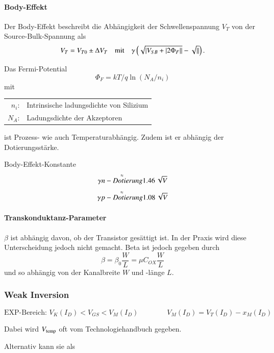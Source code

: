 \paragraph{Body-Effekt}
Der Body-Effekt beschreibt die Abhängigkeit der Schwellenspannung $V_T$ von der Source-Bulk-Spannung als
\[
    V_T = V_{T0} \pm \Delta V_T \quad \text{mit} \quad \gamma\left(\sqrt{\left|V_{SB}+\left|2\Phi_F\right|\right|}-\sqrt{\left|\right|}\right).
\]

Das Fermi-Potential
\[
    \Phi_F = kT/q \ln(N_A/n_i)
\]
mit 
\begin{tabular}{rl}
    $n_i$:& Intrinsische ladungsdichte von Silizium\\
    $N_A$:& Ladungsdichte der Akzeptoren
\end{tabular}
ist Prozess- wie auch Temperaturabhängig.
Zudem ist er abhängig der Dotierungsstärke.



Body-Effekt-Konstante
\[
    \gamma \overset{\approx}{n-Dotierung} \qty{1.46}{\sqrt{\volt}}
\]
\[
    \gamma \overset{\approx}{p-Dotierung} \qty{1.08}{\sqrt{\volt}}
\]
\paragraph{Transkonduktanz-Parameter}
$\beta$ ist abhängig davon, ob der Transistor gesättigt ist. 
In der Praxis wird diese Unterscheidung jedoch nicht gemacht. 
Beta ist jedoch gegeben durch 
\[
    \beta = \beta_0 \frac{W}{L} = \mu C_{OX} \frac{W}{L}
\]
und so abhängig von der Kanalbreite $W$ und -länge $L$.



\subsubsection{Weak Inversion}

\vspace{-0.3cm}

$$ \boxed{ \text{EXP-Bereich: } V_K(I_D) < V_{GS} < V_M(I_D) \qquad \qquad V_M(I_D) = V_T(I_D) - x_M(I_D) } $$

Dabei wird $V_{\rm temp}$ oft vom Technologiehandbuch gegeben. 

Alternativ kann sie als 

